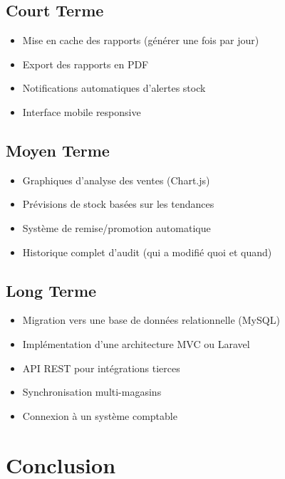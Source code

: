 \documentclass[12pt,a4paper]{report}
\begin{document}
\section{Court Terme}

\begin{itemize}
    \item Mise en cache des rapports (générer une fois par jour)
    \item Export des rapports en PDF
    \item Notifications automatiques d'alertes stock
    \item Interface mobile responsive
\end{itemize}

\section{Moyen Terme}

\begin{itemize}
    \item Graphiques d'analyse des ventes (Chart.js)
    \item Prévisions de stock basées sur les tendances
    \item Système de remise/promotion automatique
    \item Historique complet d'audit (qui a modifié quoi et quand)
\end{itemize}

\section{Long Terme}

\begin{itemize}
    \item Migration vers une base de données relationnelle (MySQL)
    \item Implémentation d'une architecture MVC ou Laravel
    \item API REST pour intégrations tierces
    \item Synchronisation multi-magasins
    \item Connexion à un système comptable
\end{itemize}

\pagebreak

\chapter{Conclusion}
\end{document}
